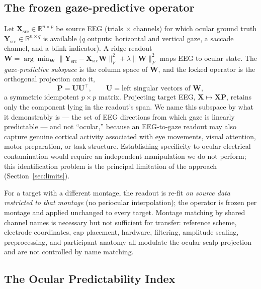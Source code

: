 \documentclass[conference]{IEEEtran}
\begin{document}
\subsection{The frozen gaze-predictive operator}

Let $\mathbf{X}_{\mathrm{src}}\in\mathbb{R}^{n\times p}$ be source EEG (trials $\times$
channels) for which ocular ground truth $\mathbf{Y}_{\mathrm{src}}\in\mathbb{R}^{n\times q}$
is available ($q$ outputs: horizontal and vertical gaze, a saccade channel, and a blink
indicator). A ridge readout
$\mathbf{W}=\arg\min_{\mathbf W}\lVert \mathbf{Y}_{\mathrm{src}}-\mathbf{X}_{\mathrm{src}}\mathbf{W}\rVert_F^2+\lambda\lVert\mathbf{W}\rVert_F^2$
maps EEG to ocular state. The \emph{gaze-predictive subspace} is the column space of
$\mathbf{W}$, and the locked operator is the orthogonal projection onto it,
\begin{equation}
\mathbf{P}=\mathbf{U}\mathbf{U}^{\top},\qquad \mathbf{U}=\text{left singular vectors of }\mathbf{W},
\label{eq:proj}
\end{equation}
a symmetric idempotent $p\times p$ matrix. Projecting target EEG, $\mathbf{X}\mapsto\mathbf{X}\mathbf{P}$,
retains only the component lying in the readout's span. We name this subspace by what it
demonstrably is --- the set of EEG directions from which gaze is linearly predictable --- and not
``ocular,'' because an EEG-to-gaze readout may also capture genuine cortical activity associated
with eye movements, visual attention, motor preparation, or task structure. Establishing
specificity to ocular electrical contamination would require an independent manipulation we do
not perform; this identification problem is the principal limitation of the approach
(Section~\ref{sec:limits}).

For a target with a different montage, the readout is re-fit \emph{on source data restricted to
that montage} (no periocular interpolation); the operator is frozen per montage and applied
unchanged to every target. Montage matching by shared channel names is necessary but not
sufficient for transfer: reference scheme, electrode coordinates, cap placement, hardware,
filtering, amplitude scaling, preprocessing, and participant anatomy all modulate the ocular scalp projection and are not
controlled by name matching.

\subsection{The Ocular Predictability Index}
\end{document}
